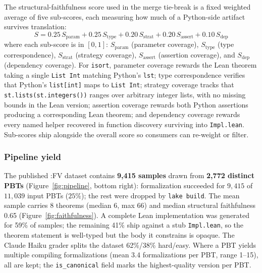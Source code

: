 The structural-faithfulness score used in the merge tie-break is a fixed weighted average of five sub-scores, each measuring how much of a Python-side artifact survives translation:
\begin{equation}
  S = 0.25\,S_{\text{param}} + 0.25\,S_{\text{type}} + 0.20\,S_{\text{strat}} + 0.20\,S_{\text{assert}} + 0.10\,S_{\text{dep}}
  \label{eq:faithfulness}
\end{equation}
where each sub-score is in $[0,1]$: $S_{\text{param}}$ (parameter coverage), $S_{\text{type}}$ (type correspondence), $S_{\text{strat}}$ (strategy coverage), $S_{\text{assert}}$ (assertion coverage), and $S_{\text{dep}}$ (dependency coverage). For
\texttt{isort}, parameter coverage rewards the Lean theorem taking a
single \texttt{List Int} matching Python's \texttt{lst}; type
correspondence verifies that Python's  \texttt{list[int]} maps to \texttt{List Int}; strategy coverage tracks that \texttt{st.lists(st.integers())} ranges over arbitrary integer lists, with no missing bounds in the Lean version; assertion coverage rewards both Python assertions producing a corresponding Lean theorem; and dependency coverage rewards every named helper recovered in function discovery surviving into \texttt{Impl.lean}. Sub-scores ship alongside the overall score so consumers can re-weight or filter.

\subsubsection{Pipeline yield}
\label{sec:pipeline-yield}

The published \FVSpec:FV dataset contains
\textbf{9{,}415 samples} drawn from \textbf{2{,}772 distinct PBTs}
(Figure~\ref{fig:pipeline}, bottom right):
formalization succeeded for $9{,}415$ of $11{,}039$ input PBTs ($25\%$);
the rest were dropped by \texttt{lake build}. The mean sample carries 8 theorems
(median 6, max 66) and median structural faithfulness 0.65 (Figure~\ref{fig:faithfulness}). A complete Lean implementation was generated for 59\% of samples; the remaining 41\% ship
against a stub \texttt{Impl.lean}, so the theorem statement is well-typed
but the body it constrains is opaque. The Claude Haiku grader splits the
dataset 62\%/38\% hard/easy. Where a PBT yields multiple compiling
formalizations (mean 3.4 formalizations per PBT, range 1--15), all are kept; the
\texttt{is\_canonical} field marks the highest-quality version per PBT.

